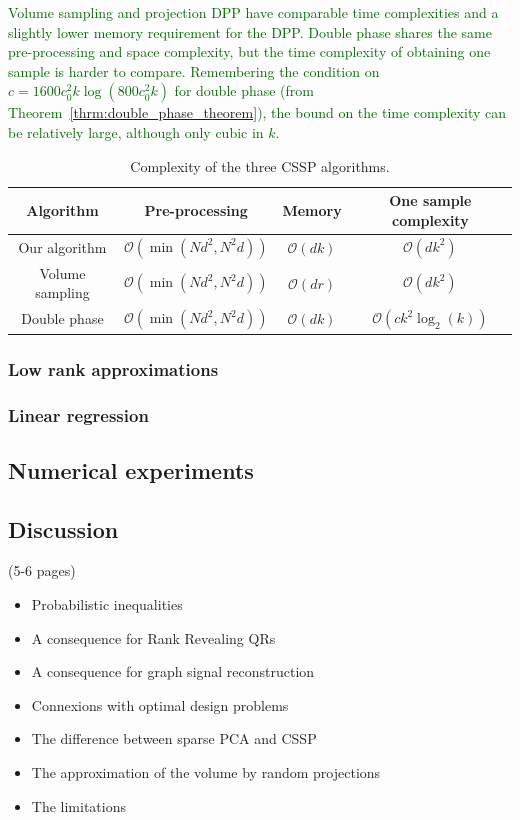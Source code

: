 \documentclass[twoside,11pt]{book}
\newcommand{\rev}[1]{\textcolor{darkgreen}{#1}}
\numberwithin{theorem}{chapter}
\numberwithin{definition}{chapter}
\numberwithin{proposition}{chapter}
\numberwithin{corollary}{chapter}
\numberwithin{example}{chapter}
\numberwithin{lemma}{chapter}
\begin{document}
\rev{Volume sampling and projection DPP have comparable time complexities and a slightly lower memory requirement for the DPP. Double phase shares the same pre-processing and space complexity, but the time complexity of obtaining one sample is harder to compare. Remembering the condition on $c = 1600 c_{0}^{2}k \log(800 c_{0}^{2} k)$ for double phase (from Theorem~\ref{thrm:double_phase_theorem}), the bound on the time complexity can be relatively large, although only cubic in $k$.}
\begin{table}
\centering
 \begin{tabular}{| c| c| c| c|}
 \hline
  Algorithm & Pre-processing & Memory & One sample complexity\\
 \hline
 Our algorithm & $\mathcal{O}(\min(N d^{2},N^{2}d))$ & $\mathcal{O}(dk)$ & $\mathcal{O}(dk^{2})$\\
 \hline
 Volume sampling & $\mathcal{O}(\min(N d^{2},N^{2}d))$ & $\mathcal{O}(dr)$ & $\mathcal{O}(dk^{2})$ \\
 \hline
 Double phase  & $\mathcal{O}(\min(N d^{2},N^{2}d))$ & $\mathcal{O}(dk)$ & $\mathcal{O}(c k^{2} \log_{2}(k))$\\
 \hline
\end{tabular}
\caption{Complexity of the three CSSP algorithms.\label{table:CSSP_complexity}}
\end{table}

\subsubsection{Low rank approximations}
\subsubsection{Linear regression}
\subsection{Numerical experiments}
\subsection{Discussion} (5-6 pages)
\begin{itemize}
\item Probabilistic inequalities
\item A consequence for Rank Revealing QRs
\item A consequence for graph signal reconstruction
\item Connexions with optimal design problems
\item The difference between sparse PCA and CSSP
\item The approximation of the volume by random projections 
\item The limitations 
\end{itemize}
\end{document}
